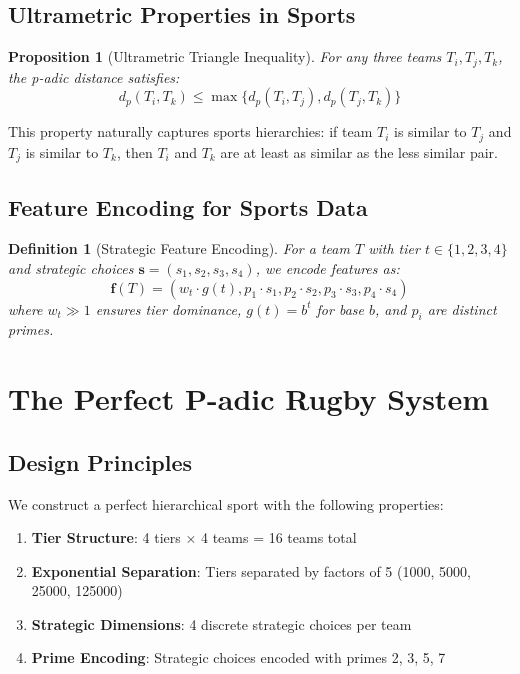 \documentclass[11pt,a4paper]{article}
\newtheorem{definition}{Definition}
\newtheorem{proposition}{Proposition}
\begin{document}
\subsection{Ultrametric Properties in Sports}

\begin{proposition}[Ultrametric Triangle Inequality]
For any three teams $T_i, T_j, T_k$, the p-adic distance satisfies:
\[
d_p(T_i, T_k) \leq \max\{d_p(T_i, T_j), d_p(T_j, T_k)\}
\]
\end{proposition}

This property naturally captures sports hierarchies: if team $T_i$ is similar to $T_j$ and $T_j$ is similar to $T_k$, then $T_i$ and $T_k$ are at least as similar as the less similar pair.

\subsection{Feature Encoding for Sports Data}

\begin{definition}[Strategic Feature Encoding]
For a team $T$ with tier $t \in \{1,2,3,4\}$ and strategic choices $\mathbf{s} = (s_1, s_2, s_3, s_4)$, we encode features as:
\[
\mathbf{f}(T) = (w_t \cdot g(t), p_1 \cdot s_1, p_2 \cdot s_2, p_3 \cdot s_3, p_4 \cdot s_4)
\]
where $w_t \gg 1$ ensures tier dominance, $g(t) = b^t$ for base $b$, and $p_i$ are distinct primes.
\end{definition}

\section{The Perfect P-adic Rugby System}

\subsection{Design Principles}

We construct a perfect hierarchical sport with the following properties:

\begin{enumerate}
    \item \textbf{Tier Structure}: 4 tiers × 4 teams = 16 teams total
    \item \textbf{Exponential Separation}: Tiers separated by factors of 5 (1000, 5000, 25000, 125000)
    \item \textbf{Strategic Dimensions}: 4 discrete strategic choices per team
    \item \textbf{Prime Encoding}: Strategic choices encoded with primes 2, 3, 5, 7
\end{enumerate}
\end{document}
